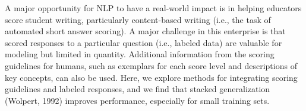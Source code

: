 A major opportunity for NLP to have a real-world impact is in helping educators score student writing, particularly content-based writing (i.e., the task of automated short answer scoring).  A major challenge in this enterprise is that scored responses to a particular question (i.e., labeled data) are valuable for modeling but limited in quantity.  Additional information from the scoring guidelines for humans, such as exemplars for each score level and descriptions of key concepts, can also be used.  Here, we explore methods for integrating scoring guidelines and labeled responses, and we find that stacked generalization (Wolpert, 1992) improves performance, especially for small training sets.
